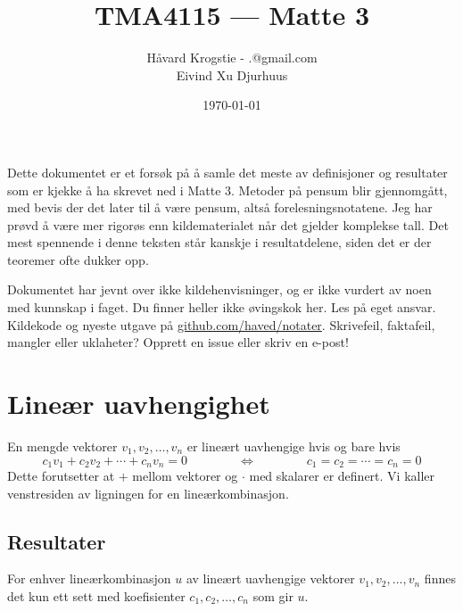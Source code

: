 \documentclass[12pt,a4paper,norsk]{article}
\title{TMA4115 --- Matte 3}
\author{Håvard Krogstie - {\lst{}.\fst{}@gmail.com} \\ Eivind Xu Djurhuus}
\date{\today}
\begin{document}
\maketitle

\noindent
Dette dokumentet er et forsøk på å samle det meste av definisjoner og resultater
som er kjekke å ha skrevet ned i Matte 3. Metoder på pensum blir gjennomgått,
med bevis der det later til å være pensum, altså forelesningsnotatene. Jeg har
prøvd å være mer rigorøs enn kildematerialet når det gjelder komplekse tall.
Det mest spennende i denne teksten står kanskje i resultatdelene, siden
det er der teoremer ofte dukker opp.

Dokumentet har jevnt over ikke kildehenvisninger, og er ikke vurdert av noen
med kunnskap i faget. Du finner heller ikke øvingskok her. Les på eget ansvar.
Kildekode og nyeste utgave på
\href{https://github.com/haved/notater/}{github.com/haved/notater}. Skrivefeil,
faktafeil, mangler eller uklaheter? Opprett en issue eller skriv en e-post!

\clearpage
\tableofcontents
\clearpage

\section{Lineær uavhengighet}
En mengde vektorer $v_{1}, v_{2}, \ldots, v_{n}$ er lineært uavhengige hvis og bare
hvis
\[c_{1}v_{1} + c_{2}v_{2} + \cdots + c_{n}v_{n} = 0 \hspace{4em} \Longleftrightarrow \hspace{4em} c_{1}=c_{2}=\cdots=c_{n}=0\]
Dette forutsetter at $+$ mellom vektorer og $\cdot$ med skalarer er definert. Vi
kaller venstresiden av ligningen for en lineærkombinasjon.

\subsection{Resultater}
For enhver lineærkombinasjon $u$ av lineært uavhengige vektorer
$v_{1}, v_{2}, \ldots, v_{n}$ finnes det kun ett sett med koefisienter
$c_{1}, c_{2}, \ldots, c_{n}$ som gir $u$.
\end{document}
